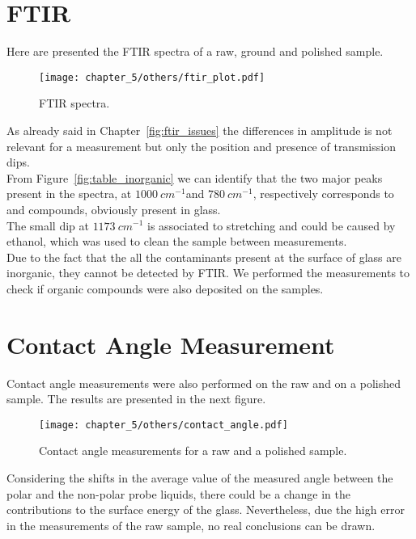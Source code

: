 \label{ch:experimental_results}

\section{FTIR}
Here are presented the FTIR spectra of a raw, ground and polished sample. 

\begin{figure}[H]
    \centering
    \texttt{[image: chapter\_5/others/ftir\_plot.pdf]} 
    \vspace*{-30pt}
    \caption{FTIR spectra.}
    \label{fig:ftir_plot}
 \end{figure}
 As already said in Chapter~\ref{fig:ftir_issues} the differences in amplitude is not relevant for a measurement but only the position and presence of transmission dips. 
\\
From Figure~\ref{fig:table_inorganic} we can identify that the two major peaks present in the spectra, at $1000 \:cm^{-1} $and $780 \:cm^{-1}$, respectively corresponds to  and  compounds, obviously present in glass.
\\
The small dip at $1173 \:cm^{-1}$ is associated to  stretching and could be caused by ethanol, which was used to clean the sample between measurements. 
\\
Due to the fact that the all the contaminants present at the surface of glass are inorganic, they cannot be detected by FTIR. We performed the measurements to check if organic compounds were also deposited on the samples.

\section{Contact Angle Measurement}
Contact angle measurements were also performed on the raw and on a polished sample. The results are presented in the next figure.
\begin{figure}[H]
    \centering
    \texttt{[image: chapter\_5/others/contact\_angle.pdf]} 
    \vspace*{-30pt}
    \caption{Contact angle measurements for a raw and a polished sample. }
    \label{fig:contact_angle_raw_polished}
 \end{figure}
Considering the shifts in the average value of the measured angle between the polar and the non-polar probe liquids, there could be a change in the contributions to the surface energy of the glass. Nevertheless, due the high error in the measurements of the raw sample, no real conclusions can be drawn.

